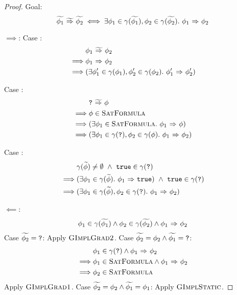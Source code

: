 \begin{proof}
    Goal:
    $${\widetilde{\phi_1}} \,\,{\widetilde{\Rightarrow}}\,\, {\widetilde{\phi_2}} \iff \exists \phi_1 \in \gamma(\widetilde{\phi_1}), \phi_2 \in \gamma(\widetilde{\phi_2}).~ {\phi_1} \,\,{\Rightarrow}\,\, {\phi_2}$$
    
    $\implies$:
        Case :
        \begin{align*}
        &{\phi_1} \,\,{\widetilde{\Rightarrow}}\,\, {\phi_2}\\
        \implies
        &{\phi_1} \,\,{\Rightarrow}\,\, {\phi_2}\\
        \implies
        &(\exists \phi_1' \in \gamma(\phi_1), \phi_2' \in \gamma(\phi_2).~ {\phi_1'} \,\,{\Rightarrow}\,\, {\phi_2'})
        \end{align*}
        
        Case :
        \begin{align*}
        &{\textup{\texttt{?}}} \,\,{\widetilde{\Rightarrow}}\,\, {\phi}\\
        \implies
        &\phi \in \textup{\textsc{SatFormula}}\\
        \implies
        &(\exists \phi_1 \in \textup{\textsc{SatFormula}}.~ {\phi_1} \,\,{\Rightarrow}\,\, {\phi})\\
        \implies
        &(\exists \phi_1 \in \gamma(\textup{\texttt{?}}), \phi_2 \in \gamma(\phi).~ {\phi_1} \,\,{\Rightarrow}\,\, {\phi_2})
        \end{align*}
        
        Case :
        \begin{align*}
        &\gamma(\widetilde{\phi}) \neq \emptyset ~\wedge~ \textup{\texttt{true}} \in \gamma(\textup{\texttt{?}})\\
        \implies
        &(\exists \phi_1 \in \gamma(\widetilde{\phi}).~ {\phi_1} \,\,{\Rightarrow}\,\, {\textup{\texttt{true}}}) ~\wedge~ \textup{\texttt{true}} \in \gamma(\textup{\texttt{?}})\\
        \implies
        &(\exists \phi_1 \in \gamma(\widetilde{\phi}), \phi_2 \in \gamma(\textup{\texttt{?}}).~ {\phi_1} \,\,{\Rightarrow}\,\, {\phi_2})
        \end{align*}
        
    $\impliedby$:
        \begin{align*}
        \phi_1 \in \gamma(\widetilde{\phi_1}) \wedge \phi_2 \in \gamma(\widetilde{\phi_2}) \wedge {\phi_1} \,\,{\Rightarrow}\,\, {\phi_2}
        \end{align*}
        Case $\widetilde{\phi_2} = \textup{\texttt{?}}$:
            Apply $\textup{\textsc{GImplGrad2}}$.
        Case $\widetilde{\phi_2} = \phi_2 \wedge \widetilde{\phi_1} = \textup{\texttt{?}}$:
            \begin{align*}
            &\phi_1 \in \gamma(\textup{\texttt{?}}) \wedge {\phi_1} \,\,{\Rightarrow}\,\, {\phi_2}\\
            \implies
            &\phi_1 \in \textup{\textsc{SatFormula}} \wedge {\phi_1} \,\,{\Rightarrow}\,\, {\phi_2}\\
            \implies
            &\phi_2 \in \textup{\textsc{SatFormula}}
            \end{align*}
            Apply $\textup{\textsc{GImplGrad1}}$.
        Case $\widetilde{\phi_2} = \phi_2 \wedge \widetilde{\phi_1} = \phi_1$:
            Apply $\textup{\textsc{GImplStatic}}$.
\end{proof}

